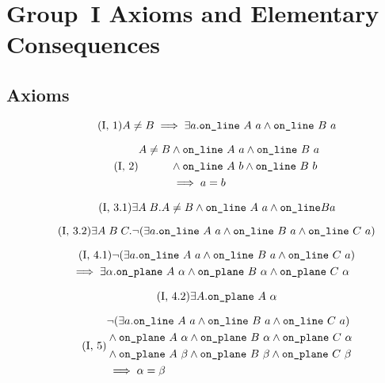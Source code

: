 \chapter{Group~I Axioms and Elementary Consequences}\label{app:group1}

\section{Axioms}
\begin{equation}\label{eq:g11}
  \tag{I,~1}
    A \neq B \implies \exists a. \texttt{on\_line}\ A\ a \wedge \texttt{on\_line}\ B\ a
\end{equation}

\begin{equation}\label{eq:g12}
  \tag{I,~2}
  \begin{split}
    A \neq B &\wedge \code{on\_line}\ A\ a \wedge \code{on\_line}\ B\ a\\
    &\wedge \code{on\_line}\ A\ b \wedge \code{on\_line}\ B\ b\\
    &\implies a = b
  \end{split}
\end{equation}

\begin{equation}\label{eq:g13a}
  \tag{I,~3.1}
  \exists A\; B. A \neq B \wedge \texttt{on\_line}\ A\ a \wedge \texttt{on\_line} B a
\end{equation}

\begin{equation}\label{eq:g13b}
  \tag{I,~3.2}
  \exists A\; B\; C. \neg(\exists a.\texttt{on\_line}\ A\ a\wedge \texttt{on\_line}\ B\ a\wedge \texttt{on\_line}\ C\ a)
\end{equation}

\begin{multline}\label{eq:g14a}
  \tag{I,~4.1}
  \neg(\exists a.\texttt{on\_line}\ A\ a\wedge \texttt{on\_line}\ B\ a\wedge \texttt{on\_line}\ C\ a)\\\quad \implies \exists \alpha. \texttt{on\_plane}\ A\ \alpha \wedge \texttt{on\_plane}\ B\ \alpha \wedge \texttt{on\_plane}\ C\ \alpha
\end{multline}

\begin{equation}\label{eq:g14b}
  \tag{I,~4.2}
  \exists A. \texttt{on\_plane}\ A\ \alpha
\end{equation}

\begin{equation}\label{eq:g15}
  \tag{I,~5}
  \begin{split}
    &\Triangle{a}{A}{B}{C}\\
    &\wedge \code{on\_plane}\ A\ \alpha \wedge \code{on\_plane}\ B\ \alpha \wedge \code{on\_plane}\ C\ \alpha\\
    &\wedge \code{on\_plane}\ A\ \beta \wedge \code{on\_plane}\ B\ \beta \wedge \code{on\_plane}\ C\ \beta\\
    &\implies \alpha = \beta
  \end{split}
\end{equation}

